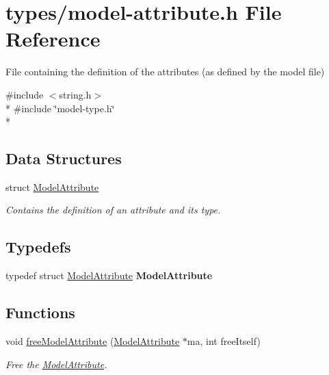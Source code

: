 \hypertarget{model-attribute_8h}{}\section{types/model-\/attribute.h File Reference}
\label{model-attribute_8h}


File containing the definition of the attributes (as defined by the model file)  


{\ttfamily \#include $<$string.\+h$>$}\\*
{\ttfamily \#include \char`\"{}model-\/type.\+h\char`\"{}}\\*
\subsection*{Data Structures}
\begin{DoxyCompactItemize}
\item 
struct \hyperlink{struct_model_attribute}{Model\+Attribute}
\begin{DoxyCompactList}\small\item\em Contains the definition of an attribute and its type. \end{DoxyCompactList}\end{DoxyCompactItemize}
\subsection*{Typedefs}
\begin{DoxyCompactItemize}
\item 
typedef struct \hyperlink{struct_model_attribute}{Model\+Attribute} {\bfseries Model\+Attribute}\hypertarget{model-attribute_8h_a1905627f613f3d101010c52d122d9120}{}\label{model-attribute_8h_a1905627f613f3d101010c52d122d9120}

\end{DoxyCompactItemize}
\subsection*{Functions}
\begin{DoxyCompactItemize}
\item 
void \hyperlink{model-attribute_8h_aeccf8686b4feb95749f4f46f6c3c3720}{free\+Model\+Attribute} (\hyperlink{struct_model_attribute}{Model\+Attribute} $\ast$ma, int free\+Itself)
\begin{DoxyCompactList}\small\item\em Free the \hyperlink{struct_model_attribute}{Model\+Attribute}. \end{DoxyCompactList}\end{DoxyCompactItemize}


